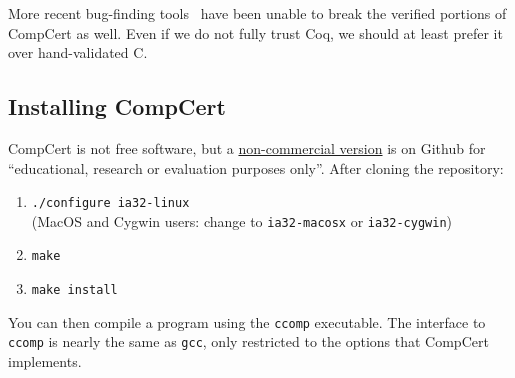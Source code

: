 More recent bug-finding tools~\cite{las-compiler} have been unable to break the verified portions of CompCert as well.
Even if we do not fully trust Coq, we should at least prefer it over hand-validated C. 


\subsection{Installing CompCert}

CompCert is not free software, but a \href{https://github.com/AbsInt/CompCert}{non-commercial version} is on Github for ``educational, research or evaluation purposes only''.
After cloning the repository:
\begin{enumerate}
\item {\tt ./configure ia32-linux} \\
      (MacOS and Cygwin users: change to {\tt ia32-macosx} or {\tt ia32-cygwin})
\item {\tt make}
\item {\tt make install}
\end{enumerate}

You can then compile a program using the {\tt ccomp} executable.
The interface to {\tt ccomp} is nearly the same as {\tt gcc}, only restricted to the options that CompCert implements.

